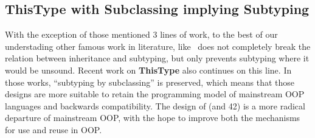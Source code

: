 \subsection{ThisType with Subclassing implying Subtyping}
With the exception of those mentioned 3 lines of work, to the best of our understading
other famous work in literature, like~\cite{odersky2008programming,nystrom2006j}
does not completely break the relation between inheritance and subtyping, but only prevents subtyping where 
it would be unsound.
Recent work on {\bf ThisType} \cite{Saito:2009,ryu16ThisType}
also continues on this line.
In those works, ``subtyping by subclassing'' is preserved, which means
that those designs are more suitable to retain the programming model
of mainstream OOP languages and backwards compatibility. The design 
of \name (and 42) is a more radical departure of mainstream OOP, with
the hope to improve both the mechanisms for use and reuse in OOP.



